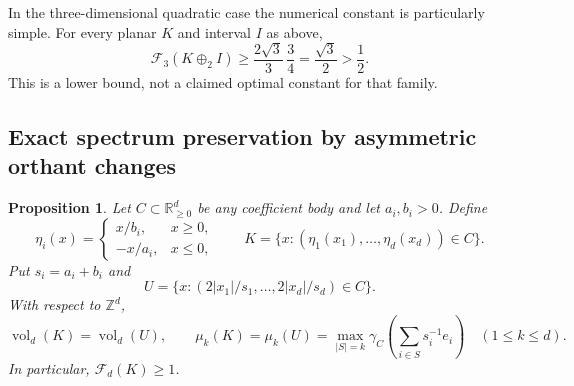 \documentclass[11pt,a4paper]{article}
\newtheorem{proposition}[theorem]{Proposition}
\theoremstyle{remark}\newtheorem{remark}[theorem]{Remark}
\begin{document}
In the three-dimensional quadratic case the numerical constant is
particularly simple.  For every planar $K$ and interval $I$ as above,
\[
 \mathcal F_3(K\oplus_2 I)
     \ge\frac{2\sqrt3}{3}\,\frac34
     =\frac{\sqrt3}{2}>\frac12.
\]
This is a lower bound, not a claimed optimal constant for that family.

\subsection{Exact spectrum preservation by asymmetric orthant changes}

\begin{proposition}\label{c6f:prop:asymmetric}
Let $C\subset\mathbb R_{\ge0}^d$ be any coefficient body and let
$a_i,b_i>0$.  Define
\[
 \eta_i(x)=\begin{cases}x/b_i,&x\ge0,\\-x/a_i,&x\le0,
                    \end{cases}
 \qquad
 K=\{x:(\eta_1(x_1),\ldots,\eta_d(x_d))\in C\}.
\]
Put $s_i=a_i+b_i$ and
\[
 U=\{x:(2|x_1|/s_1,\ldots,2|x_d|/s_d)\in C\}.
\]
With respect to $\mathbb Z^d$,
\begin{equation}\label{c6f:eq:spectrum}
 \operatorname{vol}_d(K)=\operatorname{vol}_d(U),\qquad
 \mu_k(K)=\mu_k(U)=
    \max_{|S|=k}\gamma_C\left(\sum_{i\in S}s_i^{-1}e_i\right)
       \quad(1\le k\le d).
\end{equation}
In particular, $\mathcal F_d(K)\ge1$.
\end{proposition}
\end{document}
